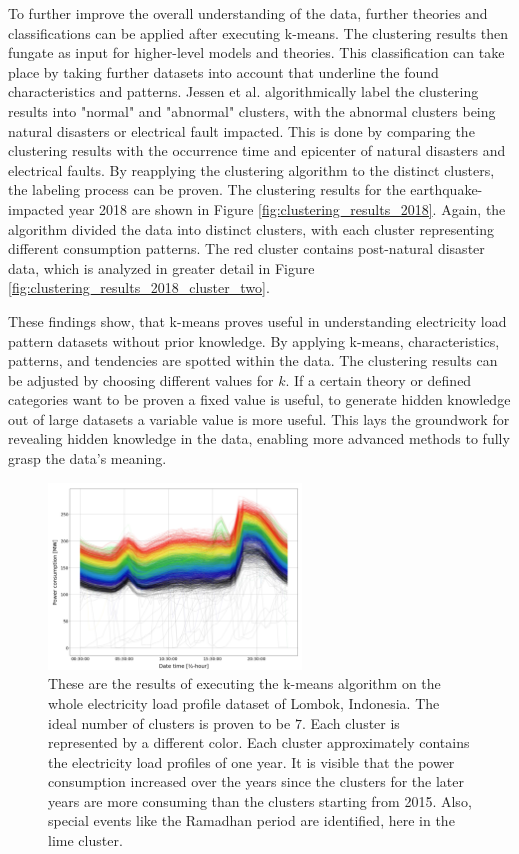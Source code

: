 To further improve the overall understanding of the data, further theories and classifications can be applied after executing k-means.
The clustering results then fungate as input for higher-level models and theories.
This classification can take place by taking further datasets into account that underline the found characteristics and patterns.
Jessen et al. \cite{JES-IND} algorithmically label the clustering results into "normal" and "abnormal" clusters, with the abnormal clusters being natural disasters or electrical fault impacted.
This is done by comparing the clustering results with the occurrence time and epicenter of natural disasters and electrical faults.
By reapplying the clustering algorithm to the distinct clusters, the labeling process can be proven.
The clustering results for the earthquake-impacted year 2018 are shown in Figure \ref{fig:clustering_results_2018}.
Again, the algorithm divided the data into distinct clusters, with each cluster representing different consumption patterns.
The red cluster contains post-natural disaster data, which is analyzed in greater detail in Figure \ref{fig:clustering_results_2018_cluster_two}.

These findings show, that k-means proves useful in understanding electricity load pattern datasets without prior knowledge.
By applying k-means, characteristics, patterns, and tendencies are spotted within the data.
The clustering results can be adjusted by choosing different values for $k$.
If a certain theory or defined categories want to be proven a fixed value is useful, to generate hidden knowledge out of large datasets a variable value is more useful.
This lays the groundwork for revealing hidden knowledge in the data, enabling more advanced methods to fully grasp the data's meaning.

\begin{figure}[H]
    \centering
    \includegraphics[width=0.6\textwidth]{figures/jessen_ndImpactedClusters/jessen_wholeDataClustering.png}
    \caption{These are the results of executing the k-means algorithm on the whole electricity load profile dataset of Lombok, Indonesia.
    The ideal number of clusters is proven to be $7$.
    Each cluster is represented by a different color.
    Each cluster approximately contains the electricity load profiles of one year.
    It is visible that the power consumption increased over the years since the clusters for the later years are more consuming than the clusters starting from 2015.
    Also, special events like the Ramadhan period are identified, here in the lime cluster.
    }
    \label{fig:whole_data_clustering_results}
\end{figure}


